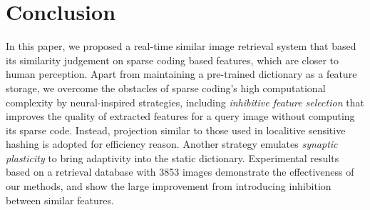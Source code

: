 \documentclass[letterpaper]{article}
\begin{document}
\section{Conclusion}
In this paper, we proposed a real-time similar image retrieval system that based its similarity judgement on sparse coding based features, which are closer to human perception. Apart from maintaining a pre-trained dictionary as a feature storage, we overcome the obstacles of sparse coding's high computational complexity by neural-inspired strategies, including \emph{inhibitive feature selection} that improves the quality of extracted features for a query image without computing its sparse code. Instead, projection similar to those used in localitive sensitive hashing is adopted for efficiency reason. Another strategy emulates \emph{synaptic plasticity} to bring adaptivity into the static dictionary. Experimental results based on a retrieval database with 3853 images demonstrate the effectiveness of our methods, and show the large improvement from introducing inhibition between similar features.


\end{document}
